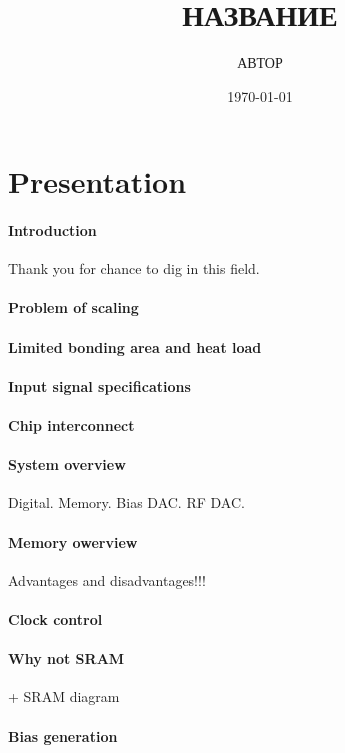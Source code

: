 \documentclass[a4paper,12pt]{article} %
\author{АВТОР }
\title{НАЗВАНИЕ}
\date{\today}
\begin{document}

\section{Presentation}
\paragraph{Introduction}
Thank you for chance to dig in this field.

\paragraph{Problem of scaling}


\paragraph{Limited bonding area and heat load}
\paragraph{Input signal specifications}
\paragraph{Chip interconnect}

\paragraph{System overview} Digital. Memory. Bias DAC. RF DAC.
\paragraph{Memory owerview}
Advantages and disadvantages!!!
\paragraph{Clock control}
\paragraph{Why not SRAM} + SRAM diagram
\paragraph{Bias generation}
\end{document}
